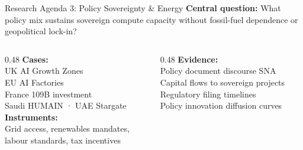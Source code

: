 \documentclass[aspectratio=169,12pt]{beamer}
\begin{document}
\begin{frame}{Research Agenda 3: Policy Sovereignty \& Energy}
\small\textbf{Central question:} What policy mix sustains sovereign compute
capacity without fossil-fuel dependence or geopolitical lock-in?\\[0.5em]
\begin{columns}[T]
\begin{column}{0.48\textwidth}
  \footnotesize
  \textbf{Cases:}\\
  UK AI Growth Zones\\
  EU AI Factories\\
  France \texteuro 109B investment\\
  Saudi HUMAIN · UAE Stargate\\[0.4em]
  \textbf{Instruments:}\\
  Grid access, renewables mandates,\\
  labour standards, tax incentives
\end{column}
\begin{column}{0.48\textwidth}
  \footnotesize
  \textbf{Evidence:}\\
  Policy document discourse SNA\\[0.3em]
  Capital flows to sovereign projects\\[0.3em]
  Regulatory filing timelines\\[0.3em]
  \alert{Policy innovation diffusion curves}
\end{column}
\end{columns}
\end{frame}
\end{document}
